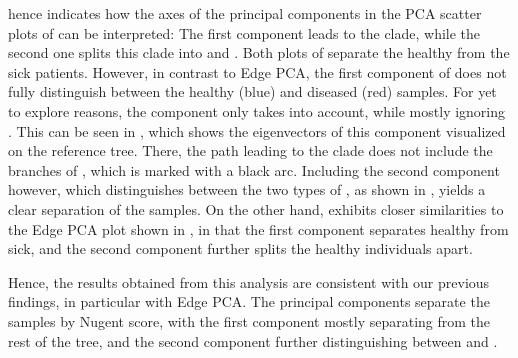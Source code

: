  hence indicates how the axes of the principal components
in the PCA scatter plots of  can be interpreted:
The first component leads to the  clade,
while the second one splits this clade into  and .
Both plots of  separate the healthy from the sick patients.
However, in contrast to Edge PCA, the first component of
does not fully distinguish between the healthy (blue) and diseased (red) samples.
For yet to explore reasons, the component only takes  into account,
while mostly ignoring .
This can be seen in ,
which shows the eigenvectors of this component visualized on the reference tree.
There, the path leading to the  clade
does not include the branches of , which is marked with a black arc.
Including the second component however, which distinguishes between the two types of ,
as shown in ,
yields a clear separation of the samples.
On the other hand, 
exhibits closer similarities to the Edge PCA plot shown in ,
in that the first component separates healthy from sick,
and the second component further splits the healthy individuals apart.

Hence, the results obtained from this analysis are consistent with our previous findings, in particular with Edge PCA.
The principal components separate the samples by Nugent score,
with the first component mostly separating  from the rest of the tree,
and the second component further distinguishing
between  and .


